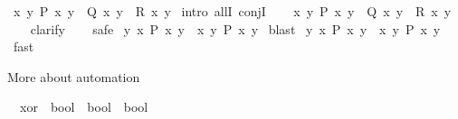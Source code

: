\begin{isabellebody}
\isadelimdocument
%
\endisadelimdocument
%
\isatagdocument
%
\isamarkuptrue%
%
\endisatagdocument
{\isafolddocument}%
%
\isadelimdocument
%
\endisadelimdocument
{}\isamarkupfalse%
\ {\isachardoublequoteopen}{\isasymforall}x\ y{\isachardot}{\kern0pt}\ P\ x\ y\ {\isasymand}\ Q\ x\ y\ {\isasymand}\ R\ x\ y{\isachardoublequoteclose}\isanewline
%
\isadelimproof
%
\endisadelimproof
%
\isatagproof
{}\isamarkupfalse%
\ {\isacharparenleft}{\kern0pt}intro\ allI\ conjI{\isacharparenright}{\kern0pt}\isanewline
\ \ \isamarkupfalse%
%
\endisatagproof
{\isafoldproof}%
%
\isadelimproof
\isanewline
%
\endisadelimproof
\isanewline
{}\isamarkupfalse%
\ {\isachardoublequoteopen}{\isasymforall}x\ y{\isachardot}{\kern0pt}\ P\ x\ y\ {\isasymand}\ Q\ x\ y\ {\isasymand}\ R\ x\ y{\isachardoublequoteclose}\isanewline
%
\isadelimproof
\ \ %
\endisadelimproof
%
\isatagproof
{}\isamarkupfalse%
\ clarify\isanewline
\ \ \isamarkupfalse%
\ safe\isanewline
{}\isamarkupfalse%
%
\endisatagproof
{\isafoldproof}%
%
\isadelimproof
\isanewline
%
\endisadelimproof
\isanewline
{}\isamarkupfalse%
\ {\isachardoublequoteopen}{\isasymexists}y{\isachardot}{\kern0pt}\ {\isasymforall}x{\isachardot}{\kern0pt}\ P\ x\ y\ {\isasymLongrightarrow}\ {\isasymforall}x{\isachardot}{\kern0pt}\ {\isasymexists}y{\isachardot}{\kern0pt}\ P\ x\ y{\isachardoublequoteclose}\isanewline
%
\isadelimproof
%
\endisadelimproof
%
\isatagproof
{}\isamarkupfalse%
\ blast\isanewline
{}\isamarkupfalse%
%
\endisatagproof
{\isafoldproof}%
%
\isadelimproof
\isanewline
%
\endisadelimproof
\isanewline
{}\isamarkupfalse%
\ {\isachardoublequoteopen}{\isasymexists}y{\isachardot}{\kern0pt}\ {\isasymforall}x{\isachardot}{\kern0pt}\ P\ x\ y\ {\isasymLongrightarrow}\ {\isasymforall}x{\isachardot}{\kern0pt}\ {\isasymexists}y{\isachardot}{\kern0pt}\ P\ x\ y{\isachardoublequoteclose}\isanewline
%
\isadelimproof
%
\endisadelimproof
%
\isatagproof
{}\isamarkupfalse%
\ fast\isanewline
\ \ \isamarkupfalse%
%
\endisatagproof
{\isafoldproof}%
%
\isadelimproof
%
\endisadelimproof
%
\begin{isamarkuptext}%
More about automation%
\end{isamarkuptext}\isamarkuptrue%
\isamarkupfalse%
\isanewline
\ \ xor\ {\isacharcolon}{\kern0pt}{\isacharcolon}{\kern0pt}\ {\isachardoublequoteopen}bool\ {\isasymRightarrow}\ bool\ {\isasymRightarrow}\ bool{\isachardoublequoteclose}\ \isanewline

\end{isabellebody}
